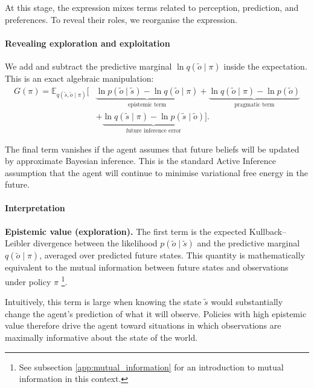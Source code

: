 \documentclass[a4paper, twoside]{article}
\begin{document}
At this stage, the expression mixes terms related to perception, prediction, and
preferences. To reveal their roles, we reorganise the expression.

\paragraph{Revealing exploration and exploitation}

We add and subtract the predictive marginal $\ln q(\tilde{o}\mid\pi)$ inside the
expectation. This is an exact algebraic manipulation:
\begin{equation}
\begin{aligned}
G(\pi)
=
\mathbb{E}_{q(\tilde{s},\tilde{o}\mid\pi)}
\big[
&\underbrace{\ln p(\tilde{o}\mid\tilde{s}) - \ln q(\tilde{o}\mid\pi)}_{\text{epistemic term}}
+
\underbrace{\ln q(\tilde{o}\mid\pi) - \ln p(\tilde{o})}_{\text{pragmatic term}} \\
&+
\underbrace{\ln q(\tilde{s}\mid\pi) - \ln p(\tilde{s}\mid\tilde{o})}_{\text{future inference error}}
\big].
\end{aligned}
\end{equation}

The final term vanishes if the agent assumes that future beliefs will be updated
by approximate Bayesian inference. This is the standard Active Inference
assumption that the agent will continue to minimise variational free energy in
the future.

\paragraph{Interpretation}

\textbf{Epistemic value (exploration).}
The first term is the expected Kullback--Leibler divergence between the likelihood
$p(\tilde{o}\mid\tilde{s})$ and the predictive marginal $q(\tilde{o}\mid\pi)$,
averaged over predicted future states. This quantity is mathematically
equivalent to the mutual information between future states and observations under
policy $\pi$ \footnote{See subsection \ref{app:mutual_information} for an introduction to mutual information in this context.}.

Intuitively, this term is large when knowing the state $\tilde{s}$ would
substantially change the agent's prediction of what it will observe. Policies
with high epistemic value therefore drive the agent toward situations in which
observations are maximally informative about the state of the world.
\end{document}
